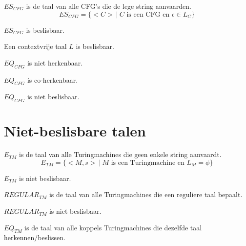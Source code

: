 \documentclass[main.tex]{subfiles}
\begin{document}
\begin{de}
  $ES_{CFG}$ is de taal van alle CFG's die de lege string aanvaarden.
  \[ ES_{CFG} = \{ <C> \ |\ C \text{ is een CFG en } \epsilon \in L_{C}\} \]
\end{de}

\begin{st}
  $ES_{CFG}$ is beslisbaar.
\end{st}

\begin{st}
  Een contextvrije taal $L$ is beslisbaar.
\end{st}

\begin{st}
  $EQ_{CFG}$ is niet herkenbaar.
\end{st}

\begin{st}
  $EQ_{CFG}$ is co-herkenbaar.
\end{st}

\begin{gev}
  $EQ_{CFG}$ is niet beslisbaar.
\end{gev}

\section{Niet-beslisbare talen}
\label{sec:niet-besl-talen}

\begin{de}
  \label{de:e-tm}
  $E_{TM}$ is de taal van alle Turingmachines die geen enkele string aanvaardt.
  \[ E_{TM} = \{ <M,s>\ |\ M \text{ is een Turingmachine en } L_{M} = \phi \} \]
\end{de}

\begin{st}
  $E_{TM}$ is niet beslisbaar.
\end{st}

\begin{de}
  \label{de:regular-tm}
  $REGULAR_{TM}$ is de taal van alle Turingmachines die een reguliere taal bepaalt.
\end{de}

\begin{st}
  $REGULAR_{TM}$ is niet beslisbaar.
\end{st}

\begin{de}
  \label{de:eq-tm}
  $EQ_{TM}$ is de taal van alle koppels Turingmachines die dezelfde taal herkennen/beslissen.
\end{de}
\end{document}
